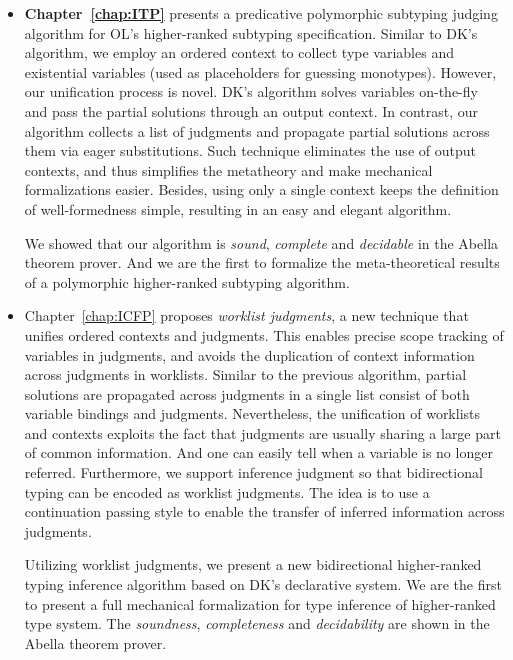 \begin{itemize}
  \item {\bf Chapter~\ref{chap:ITP}} presents a predicative polymorphic subtyping judging algorithm
    for OL's higher-ranked subtyping specification.
    Similar to DK's algorithm, we employ an ordered context to collect
    type variables and existential variables (used as placeholders for guessing monotypes).
    However, our unification process is novel.
    DK's algorithm solves variables on-the-fly and pass the partial solutions through an
    output context.
    In contrast, our algorithm collects a list of judgments and propagate partial solutions
    across them via eager substitutions.
    Such technique eliminates the use of output contexts,
    and thus simplifies the metatheory and make mechanical formalizations easier.
    Besides, using only a single context keeps the definition of well-formedness simple,
    resulting in an easy and elegant algorithm.

    We showed that our algorithm is \emph{sound},
    \emph{complete} and \emph{decidable} in the Abella theorem prover.
    And we are the first to formalize the meta-theoretical results of
    a polymorphic higher-ranked subtyping algorithm.

  \item Chapter~\ref{chap:ICFP}
    proposes \emph{worklist judgments},
    a new technique that unifies ordered contexts and judgments.
    This enables precise scope tracking of variables in judgments,
    and avoids the duplication of context information across judgments in worklists.
    Similar to the previous algorithm, partial solutions are propagated across
    judgments in a single list consist of both variable bindings and judgments.
    Nevertheless, the unification of worklists and contexts exploits the fact
    that judgments are usually sharing a large part of common information.
    And one can easily tell when a variable is no longer referred.
    Furthermore, we support inference judgment so that bidirectional typing can be
    encoded as worklist judgments.
    The idea is to use a continuation passing style to
    enable the transfer of inferred information across judgments.

    Utilizing worklist judgments, we present a new
    bidirectional higher-ranked typing inference algorithm based on DK's declarative system.
    We are the first to present a full mechanical formalization for
    type inference of higher-ranked type system.
    The \emph{soundness}, \emph{completeness} and \emph{decidability} are shown
    in the Abella theorem prover.


\end{itemize}
